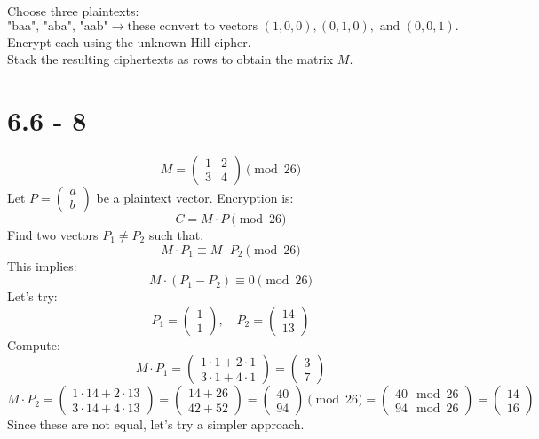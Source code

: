 \documentclass[12pt]{article}
\begin{document}
Choose three plaintexts:
\[
\text{"baa", "aba", "aab"} \rightarrow \text{these convert to vectors } (1,0,0), (0,1,0), \text{ and } (0,0,1).
\]
Encrypt each using the unknown Hill cipher. \\
Stack the resulting ciphertexts as rows to obtain the matrix \( M \).





\newpage

\section*{6.6 - 8}



\[
M = \begin{pmatrix}
1 & 2 \\
3 & 4
\end{pmatrix} \pmod{26}
\]
Let \( P = \begin{pmatrix} a \\ b \end{pmatrix} \) be a plaintext vector. Encryption is:
\[
C = M \cdot P \pmod{26}
\]
Find two vectors \( P_1 \neq P_2 \) such that:
\[
M \cdot P_1 \equiv M \cdot P_2 \pmod{26}
\]
This implies:
\[
M \cdot (P_1 - P_2) \equiv 0 \pmod{26}
\]
Let's try:
\[
P_1 = \begin{pmatrix} 1 \\ 1 \end{pmatrix}, \quad P_2 = \begin{pmatrix} 14 \\ 13 \end{pmatrix}
\]
Compute:
\[
M \cdot P_1 = \begin{pmatrix}
1 \cdot 1 + 2 \cdot 1 \\
3 \cdot 1 + 4 \cdot 1
\end{pmatrix}
= \begin{pmatrix}
3 \\
7
\end{pmatrix}
\]
\[
M \cdot P_2 = \begin{pmatrix}
1 \cdot 14 + 2 \cdot 13 \\
3 \cdot 14 + 4 \cdot 13
\end{pmatrix}
= \begin{pmatrix}
14 + 26 \\
42 + 52
\end{pmatrix}
= \begin{pmatrix}
40 \\
94
\end{pmatrix}
\pmod{26}
= \begin{pmatrix}
40 \mod 26 \\
94 \mod 26
\end{pmatrix}
= \begin{pmatrix}
14 \\
16
\end{pmatrix}
\]
Since these are not equal, let's try a simpler approach.
\end{document}
